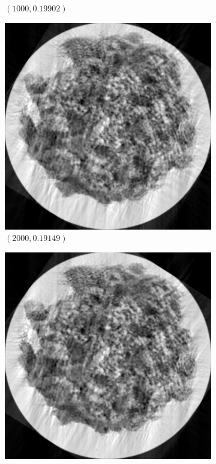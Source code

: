 \documentclass[a4paper, landscape]{article}
\begin{document}
\begin{figure}[H]
\begin{subfigure}{0.13\linewidth}
		\caption{$(1000, 0.19902)$}
	\end{subfigure}
	\begin{subfigure}{0.13\linewidth}
		\centering
		\includegraphics[width=\linewidth]{results/cryoem, N = 2000.png}
		\caption{$(2000, 0.19149)$}
	\end{subfigure}
	\begin{subfigure}{0.13\linewidth}
		\centering
		\includegraphics[width=\linewidth]{results/cryoem, N = 5000.png}

\end{subfigure}
\end{figure}
\end{document}
